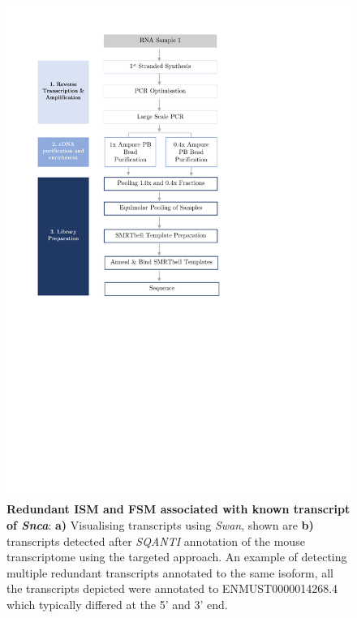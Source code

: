 \begin{figure}[htp]
	\begin{center}
		\includegraphics[page=10,trim={0cm 0cm 0 0cm},clip, scale = 0.7]{Figures/ProjectDevelopment_Figures.pdf}
	\end{center}
	\captionsetup{width=0.95\textwidth}
	\caption[Redundant ISM and FSM associated with same known isoform]%
	{\textbf{Redundant ISM and FSM associated with known transcript of \textit{Snca}}: \textbf{a)} Visualising transcripts using \textit{Swan}, shown are \textbf{b)} transcripts detected after \textit{SQANTI} annotation of the mouse transcriptome using the targeted approach. An example of detecting multiple redundant transcripts annotated to the same isoform, all the transcripts depicted were annotated to ENMUST0000014268.4 which typically differed at the 5' and 3' end.}
	\label{fig:redudant_sncatranscripts}
\end{figure}

